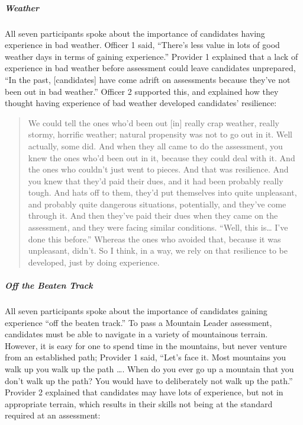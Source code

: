 \documentclass[
  12pt,
  a4paper,
]{book}
\begin{document}
\hypertarget{weather}{%
\subparagraph{Weather}\label{weather}}

All seven participants spoke about the importance of candidates having experience in bad weather. Officer 1 said, ``There's less value in lots of good weather days in terms of gaining experience.'' Provider 1 explained that a lack of experience in bad weather before assessment could leave candidates unprepared, ``In the past, {[}candidates{]} have come adrift on assessments because they've not been out in bad weather.'' Officer 2 supported this, and explained how they thought having experience of bad weather developed candidates' resilience:

\begin{quote}
We could tell the ones who'd been out {[}in{]} really crap weather, really stormy, horrific weather; natural propensity was not to go out in it. Well actually, some did. And when they all came to do the assessment, you knew the ones who'd been out in it, because they could deal with it. And the ones who couldn't just went to pieces. And that was resilience. And you knew that they'd paid their dues, and it had been probably really tough. And hats off to them, they'd put themselves into quite unpleasant, and probably quite dangerous situations, potentially, and they've come through it. And then they've paid their dues when they came on the assessment, and they were facing similar conditions. ``Well, this is\ldots{} I've done this before.'' Whereas the ones who avoided that, because it was unpleasant, didn't. So I think, in a way, we rely on that resilience to be developed, just by doing experience.
\end{quote}

\hypertarget{qual-off-the-beaten-track}{%
\subparagraph{Off the Beaten Track}\label{qual-off-the-beaten-track}}

All seven participants spoke about the importance of candidates gaining experience ``off the beaten track.'' To pass a Mountain Leader assessment, candidates must be able to navigate in a variety of mountainous terrain. However, it is easy for one to spend time in the mountains, but never venture from an established path; Provider 1 said, ``Let's face it. Most mountains you walk up you walk up the path \ldots. When do you ever go up a mountain that you don't walk up the path? You would have to deliberately not walk up the path.'' Provider 2 explained that candidates may have lots of experience, but not in appropriate terrain, which results in their skills not being at the standard required at an assessment:
\end{document}
